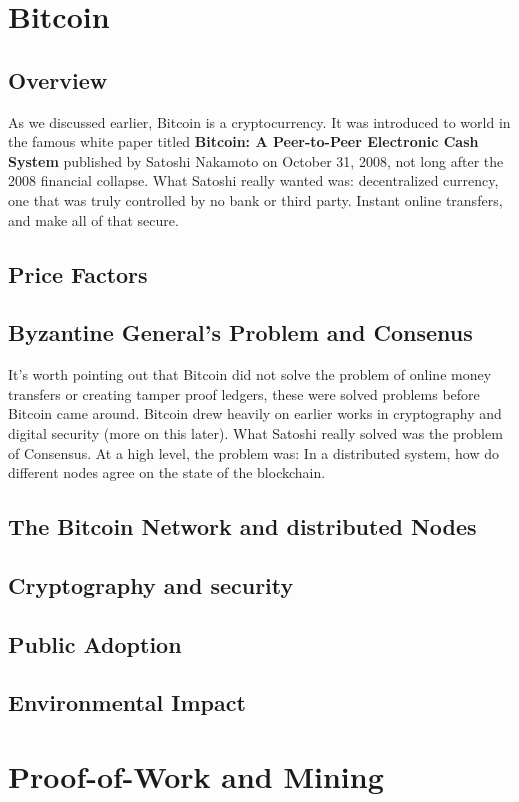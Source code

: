 \documentclass[11pt]{article} %
\begin{document}
\section{Bitcoin}{}
\subsection{Overview}{}
As we discussed earlier, Bitcoin is a cryptocurrency. It was introduced to world in the famous white paper titled \textbf{Bitcoin: A Peer-to-Peer Electronic Cash System} published by Satoshi Nakamoto on October 31, 2008, not long after the 2008 financial collapse. What Satoshi really wanted was: decentralized currency, one that was truly controlled by no bank or third party. Instant online transfers, and make all of that secure.

\subsection{Price Factors}{}
\subsection{Byzantine General's Problem and Consenus}{}
It's worth pointing out that Bitcoin did not solve the problem of online money transfers or creating tamper proof ledgers, these were solved problems before Bitcoin came around. Bitcoin drew heavily on earlier works in cryptography and digital security (more on this later). What Satoshi really solved was the problem of Consensus. At a high level, the problem was: In a distributed system, how do different nodes agree on the state of the blockchain.
\subsection{The Bitcoin Network and distributed Nodes}{}
\subsection{Cryptography and security}{}
\subsection{Public Adoption}{}
\subsection{Environmental Impact}{}


\section{Proof-of-Work and Mining}{}
\end{document}
